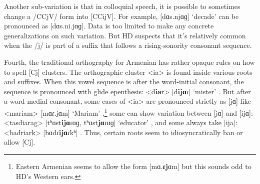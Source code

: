 	
	Another sub-variation is that in colloquial speech, it is possible to sometimes change a /CCjV/ form into [CCijV]. For example, [dɑs.njɑɡ] `decade'  can be pronounced as [dɑs.ni.jɑɡ]. Data is too limited to make any concrete generalizations on such variation. But HD suspects that it's relatively common when the /j/ is part of a suffix that follows a rising-sonority consonant sequence.
	
	Fourth, the traditional orthography for Armenian has rather opaque rules on how to spell [Cj] clusters.  The orthographic cluster  <ia> is found inside various roots and suffixes. When this vowel sequence is after the word-initial consonant, the sequence is pronounced with glide epenthesis: <d\textbf{ia}r> [d\textbf{ijɑ}ɾ] `mister' . But after a word-medial consonant, some cases of <ia> are pronounced strictly as [jɑ] like <mariam> [mɑɾ.jɑm] `Mariam' ,\footnote{Eastern Armenian seems to allow the form [mɑ.\textbf{ɾj}ɑm] but this sounds odd to HD's Western ears.}   some can show variation between [jɑ] and [ijɑ]: <tasdiarag> [tʰɑst\textbf{ijɑ}ɾɑɡ, tʰɑst\textbf{jɑ}ɾɑɡ]  `educator' , and  some always take [ija]:  <badriark> [bɑdɾ\textbf{ijɑ}ɾkʰ] .  Thus, certain roots seem to idiosyncratically ban or allow [Cj]. 
	
